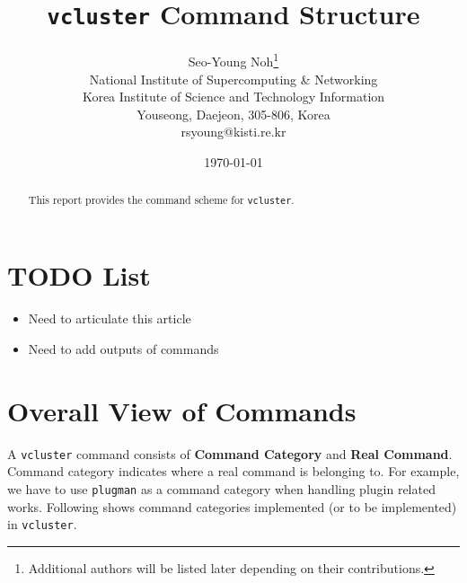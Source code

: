 \documentclass[11pt]{article}
\def \ttt{\texttt}
\def \tbf{\textbf}
\def \vb{\verb}
\begin{document}
\title{\ttt{vcluster} Command Structure}
\author{
        Seo-Young Noh\thanks{Additional authors will be listed later depending on their contributions.} \\
        $ $\\
        National Institute of Supercomputing \& Networking\\
        Korea Institute of Science and Technology Information\\
        Youseong, Daejeon, 305-806, Korea\\
        {rsyoung}@kisti.re.kr
}
\date{\today}



\maketitle

\begin{abstract}
This report provides the command scheme for \ttt{vcluster}.
\end{abstract}


\section{TODO List}

\begin{itemize}
 \item Need to articulate this article
 \item Need to add outputs of commands
\end{itemize}




\section{Overall View of Commands}

A \vb+vcluster+ command consists of \tbf{Command Category} and \tbf{Real Command}. Command category indicates where a real command is belonging to. For example, we have to use \vb+plugman+ as a command category when handling plugin related works. Following shows command categories implemented (or to be implemented) in \vb+vcluster+.
\end{document}
